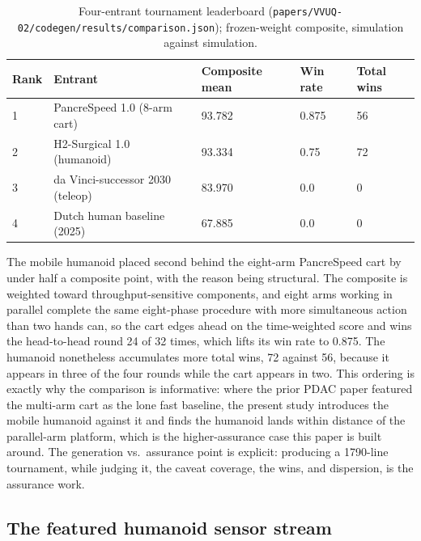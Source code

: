 \begin{table}[H]
\caption{Four-entrant tournament leaderboard (\texttt{papers/VVUQ-02/codegen/results/comparison.json}); frozen-weight composite,
simulation against simulation.}
\label{tab:leaderboard}
\centering
\footnotesize
\begin{tabularx}{\textwidth}{L{0.9cm} Y L{3cm} L{1.9cm} L{1.7cm}}
\toprule
\textbf{Rank} & \textbf{Entrant} & \textbf{Composite mean} & \textbf{Win rate} & \textbf{Total wins} \\
 & PancreSpeed 1.0 (8-arm cart) & 93.782 & 0.875 & 56 \\
2 & H2-Surgical 1.0 (humanoid) & 93.334 & 0.75 & 72 \\
3 & da Vinci-successor 2030 (teleop) & 83.970 & 0.0 & 0 \\
4 & Dutch human baseline (2025) & 67.885 & 0.0 & 0 \\
\bottomrule
\end{tabularx}
\end{table}

The mobile humanoid placed second behind the eight-arm PancreSpeed cart
by under half a composite point, with the reason being structural. The composite is weighted toward throughput-sensitive
components, and eight arms working in parallel complete the same eight-phase
procedure with more simultaneous action than two hands can, so the cart edges
ahead on the time-weighted score and wins the head-to-head round 24 of 32 times,
which lifts its win rate to 0.875. The humanoid nonetheless accumulates more total
wins, 72 against 56, because it appears in three of the four rounds while the cart
appears in two. This ordering
is exactly why the comparison is informative: where the prior PDAC paper featured
the multi-arm cart as the lone fast baseline, the present study introduces the mobile humanoid against it and finds the humanoid lands within
distance of the parallel-arm platform,
which is the higher-assurance case this paper is built around. The
generation vs.\ assurance point is explicit: producing a 1790-line tournament, while judging it, the caveat
coverage, the wins, and dispersion, is the assurance work.

\subsection{The featured humanoid sensor stream}

